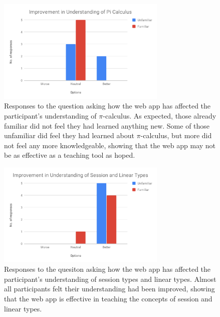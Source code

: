 \documentclass{l4proj}
\begin{document}
\begin{figure}[H]
\centering
\includegraphics[width=0.72\textwidth]{images/PiCalcImprov.pdf}
\caption{Responses to the question asking how the web app has affected the participant's understanding of $\pi$-calculus. As expected, those already familiar did not feel they had learned anything new. Some of those unfamiliar did feel they had learned about $\pi$-calculus, but more did not feel any more knowledgeable, showing that the web app may not be as effective as a teaching tool as hoped.}
\label{fig:PiCalcImprov}
\end{figure}

\begin{figure}[H]
\centering
\includegraphics[width=0.72\textwidth]{images/SesLinImprov.pdf}
\caption{Responses to the quesiton asking how the web app has affected the participant's understanding of session types and linear types. Almost all participants felt their understanding had been improved, showing that the web app is effective in teaching the concepts of session and linear types.}
\label{fig:SesLinImprov}
\end{figure}
\end{document}
